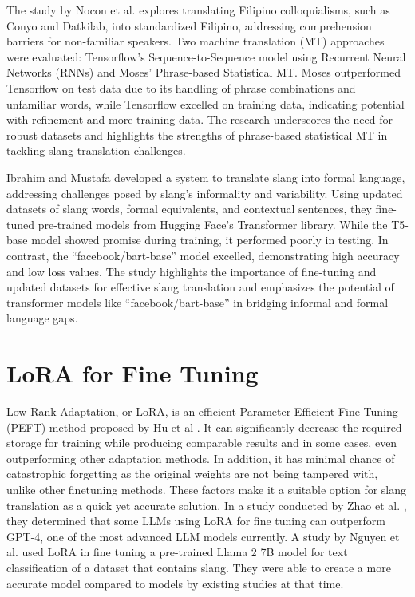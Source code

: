 The study by Nocon et al. \cite{Nocon_Kho_Arroyo_2018} explores translating Filipino colloquialisms, such as Conyo and Datkilab, into standardized Filipino, addressing comprehension barriers for non-familiar speakers. Two machine translation (MT) approaches were evaluated: Tensorflow's Sequence-to-Sequence model using Recurrent Neural Networks (RNNs) and Moses' Phrase-based Statistical MT. Moses outperformed Tensorflow on test data due to its handling of phrase combinations and unfamiliar words, while Tensorflow excelled on training data, indicating potential with refinement and more training data. The research underscores the need for robust datasets and highlights the strengths of phrase-based statistical MT in tackling slang translation challenges.

Ibrahim and Mustafa \cite{Abdulstar_Ibrahim_Shareef_Mustafa_2023}  developed a system to translate slang into formal language, addressing challenges posed by slang's informality and variability. Using updated datasets of slang words, formal equivalents, and contextual sentences, they fine-tuned pre-trained models from Hugging Face's Transformer library. While the T5-base model showed promise during training, it performed poorly in testing. In contrast, the “facebook/bart-base” model excelled, demonstrating high accuracy and low loss values. The study highlights the importance of fine-tuning and updated datasets for effective slang translation and emphasizes the potential of transformer models like “facebook/bart-base” in bridging informal and formal language gaps. 

\section{LoRA for Fine Tuning}
Low Rank Adaptation, or LoRA, is an efficient Parameter Efficient Fine Tuning (PEFT) method proposed by Hu et al \cite{hu2021loralowrankadaptationlarge}.
It can significantly decrease the required storage for training while producing comparable results and in some cases, even outperforming other adaptation methods.
In addition, it has minimal chance of catastrophic forgetting as the original weights are not being tampered with, unlike other finetuning methods.
These factors make it a suitable option for slang translation as a quick yet accurate solution.
In a study conducted by Zhao et al. \cite{zhao2024loraland310finetuned}, they determined that some LLMs using LoRA for fine tuning can outperform GPT-4, one of the most advanced LLM models currently.
A study by Nguyen et al. \cite{nguyen2023finetuningllama2large} used LoRA in fine tuning a pre-trained Llama 2 7B model for text classification of a dataset that contains slang.
They were able to create a more accurate model compared to models by existing studies at that time. 

